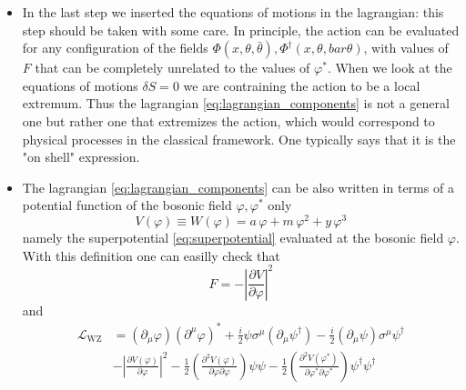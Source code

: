 \documentclass[12pt]{article}
\begin{document}
\begin{itemize}
  \item In the last step we inserted the equations of motions in the lagrangian: this step should be taken with some care. In principle, the action can be evaluated for any configuration of the fields $\Phi(x, \theta, \bar\theta), \Phi^\dagger(x,\theta, bar\theta)$, with values of $F$ that can be completely unrelated to the values of $\varphi^*$. 
  When we look at the equations of motions $\delta S = 0$ we are contraining the action to be a local extremum. Thus the lagrangian \ref{eq:lagrangian_components} is not a general one but rather one that extremizes the action, which would correspond to physical processes in the classical framework. One typically says that it is the "on shell" expression.
  \item The lagrangian \ref{eq:lagrangian_components} can be also written in terms of a potential function of the bosonic field $\varphi, \varphi^*$ only
  \begin{equation*}
    V(\varphi) \equiv W(\varphi) = a \, \varphi + m \, \varphi^2 + y \, \varphi^3
  \end{equation*}
  namely the superpotential \ref{eq:superpotential} evaluated at the bosonic field $\varphi$. With this definition one can easilly check that
  \begin{equation*}
    F = -\left|\frac{\partial V}{\partial \varphi}\right|^2
  \end{equation*}
  and 
  \begin{equation*}
    \begin{aligned}
        \mathcal{L}_{\mathrm{WZ}} &=\left(\partial_{\mu} \varphi\right)\left(\partial^{\mu} \varphi\right)^{*}+\frac{i}{2} \psi \sigma^{\mu}\left(\partial_{\mu} \psi^{\dagger}\right)-\frac{i}{2}\left(\partial_{\mu} \psi\right) \sigma^{\mu} \psi^{\dagger} \\
        &-\left|\frac{\partial V\left(\varphi\right)}{\partial \varphi}\right|^{2}-\frac{1}{2}\left(\frac{\partial^{2} V\left(\varphi\right)}{\partial \varphi \partial \varphi}\right) \psi \psi-\frac{1}{2}\left(\frac{\partial^{2} V\left(\varphi^*\right)}{\partial \varphi^{*} \partial \varphi^{*}}\right) \psi^{\dagger} \psi^{\dagger}
    \end{aligned}
\end{equation*}
\end{itemize}
\end{document}
